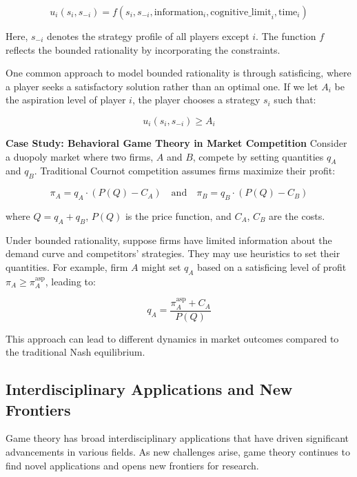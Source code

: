 \documentclass[12pt]{book} %
\begin{document}
\[
u_i(s_i, s_{-i}) = f(s_i, s_{-i}, \text{information}_i, \text{cognitive\_limit}_i, \text{time}_i)
\]

Here, $s_{-i}$ denotes the strategy profile of all players except $i$. The function $f$ reflects the bounded rationality by incorporating the constraints. 

One common approach to model bounded rationality is through satisficing, where a player seeks a satisfactory solution rather than an optimal one. If we let $A_i$ be the aspiration level of player $i$, the player chooses a strategy $s_i$ such that:

\[
u_i(s_i, s_{-i}) \geq A_i
\]

\textbf{Case Study: Behavioral Game Theory in Market Competition}
Consider a duopoly market where two firms, $A$ and $B$, compete by setting quantities $q_A$ and $q_B$. Traditional Cournot competition assumes firms maximize their profit:

\[
\pi_A = q_A \cdot (P(Q) - C_A) \quad \text{and} \quad \pi_B = q_B \cdot (P(Q) - C_B)
\]

where $Q = q_A + q_B$, $P(Q)$ is the price function, and $C_A$, $C_B$ are the costs.

Under bounded rationality, suppose firms have limited information about the demand curve and competitors' strategies. They may use heuristics to set their quantities. For example, firm $A$ might set $q_A$ based on a satisficing level of profit $\pi_A \geq \pi_A^{\text{asp}}$, leading to:

\[
q_A = \frac{\pi_A^{\text{asp}} + C_A}{P(Q)}
\]

This approach can lead to different dynamics in market outcomes compared to the traditional Nash equilibrium.

\subsection{Interdisciplinary Applications and New Frontiers}
Game theory has broad interdisciplinary applications that have driven significant advancements in various fields. As new challenges arise, game theory continues to find novel applications and opens new frontiers for research.
\end{document}

